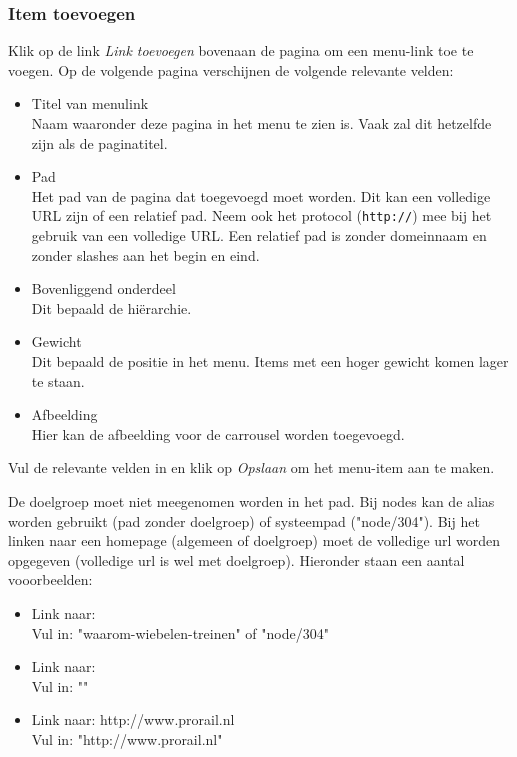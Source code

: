 \subsubsection{Item toevoegen}\label{menuitemtoevoegen}
Klik op de link \emph{Link toevoegen} bovenaan de pagina om een menu-link toe te voegen. Op de volgende pagina verschijnen de volgende relevante velden:
\begin{itemize}
\item Titel van menulink \\
  Naam waaronder deze pagina in het menu te zien is. Vaak zal dit hetzelfde zijn als de paginatitel.
\item Pad \\
  Het pad van de pagina dat toegevoegd moet worden. Dit kan een volledige URL zijn of een relatief pad. Neem ook het protocol (\texttt{http://}) mee bij het gebruik van een volledige URL. Een relatief pad is zonder domeinnaam en zonder slashes aan het begin en eind.
\item Bovenliggend onderdeel \\
  Dit bepaald de hi\"{e}rarchie.
\item Gewicht \\
  Dit bepaald de positie in het menu. Items met een hoger gewicht komen lager te staan.
\item Afbeelding \\
  Hier kan de afbeelding voor de carrousel worden toegevoegd.
\end{itemize}
Vul de relevante velden in en klik op \emph{Opslaan} om het menu-item aan te maken.

De doelgroep moet niet meegenomen worden in het pad. Bij nodes kan de alias worden gebruikt (pad zonder doelgroep) of systeempad ("node/304"). Bij het linken naar een homepage (algemeen of doelgroep) moet de volledige url worden opgegeven (volledige url is wel met doelgroep). Hieronder staan een aantal vooorbeelden:
\begin{itemize}
\item Link naar:  \\
Vul in: "waarom-wiebelen-treinen" of "node/304"
\item Link naar:  \\
Vul in: ""
\item Link naar: http://www.prorail.nl \\
Vul in: "http://www.prorail.nl"
\end{itemize}

